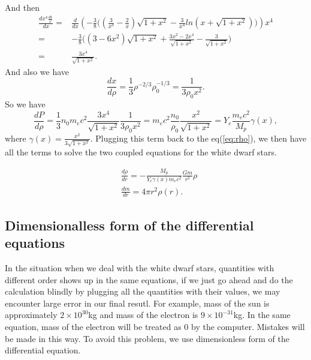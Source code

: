 \documentclass{article}
\begin{document}
And then
\begin{equation}
\begin{aligned}
\frac{dx^4\frac{d\epsilon}{x}}{dx}=&\frac{d}{dx} (-\frac{3}{8}\big( (\frac{3}{x^3} -\frac{2}{x})\sqrt{1+x^2} - \frac{3}{x^4} ln(x+\sqrt{1+x^2}) \big)) x^4 \\
=& -\frac{3}{8}\big(  (3-6x^2)\sqrt{1+x^2} + \frac{3x^2-2x^4}{\sqrt{1+x^2}} -\frac{3}{\sqrt{1+x^2}}  \big)  \\
=&\frac{3x^4}{\sqrt{1+x^2}}.
\end{aligned}
\end{equation}
And also we have
\begin{equation}
\frac{dx}{d\rho}= \frac{1}{3} \rho^{-2/3} \rho_0^{-1/3 }=\frac{1}{3\rho_0 x^2}.
\end{equation}
So we have 
\begin{equation}
\frac{dP}{d\rho} =\frac{1}{3}n_0m_ec^2  \frac{3x^4}{\sqrt{1+x^2}} \frac{1}{3\rho_0 x^2} =m_ec^2 \frac{n_0}{\rho_0} \frac{x^2}{\sqrt{1+x^2}} = Y_e \frac{m_ec^2}{M_p} \gamma(x),
\end{equation}
where $\gamma(x)= \frac{x^2}{3\sqrt{1+x^2}}$. Plugging this term back to the eq(\ref{eq:rho}), we then have all the terms to solve the two coupled equations for the white dwarf stars.

\begin{equation}
\begin{aligned}
&\frac{d\rho}{dr} = -   \frac{M_p}{Y_e \gamma(x) m_e c^2}  \frac{Gm}{r^2}\rho  \\
&\frac{dm}{dr} = 4\pi r^2 \rho(r).
\end{aligned}
\end{equation}

\subsection{Dimensionalless form of the differential equations}
In the situation when we deal with the white dwarf stars, quantities with different order shows up in the same equations, if we just go ahead and do the calculation blindly by plugging all the quantities with their values, we may encounter large error in our final resutl. For example, mass of the sun is approximately $2\times 10^{30} $kg and mass of the electron is $9\times 10^{-31}$kg. In the same equation, mass of the electron will be treated as 0 by the computer. Mistakes will be made in this way. To avoid this problem, we use dimensionless form of the differential equation.
\end{document}
